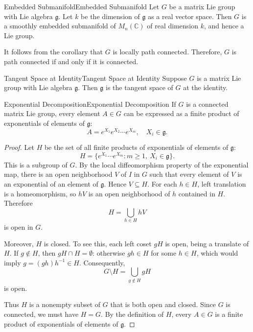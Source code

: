 \documentclass[../main.tex]{subfiles}
\begin{document}
\begin{corollary}{Embedded Submanifold}{Embedded Submanifold}
  Let $G$ be a matrix Lie group with Lie algebra $\mathfrak{g}$. Let $k$ be the dimension of $\mathfrak{g}$ as a real vector space. Then $G$ is a smoothly embedded submanifold of $M_n(\mathbb{C})$ of real dimension $k$, and hence a Lie group.
\end{corollary}
It follows from the corollary that $G$ is locally path connected. Therefore, $G$ is path connected if and only if it is connected.

\begin{corollary}{Tangent Space at Identity}{Tangent Space at Identity}
  Suppose $G$ is a matrix Lie group with Lie algebra $\mathfrak{g}$. Then $\mathfrak{g}$ is the tangent space of $G$ at the identity.
\end{corollary}

\begin{corollary}{Exponential Decomposition}{Exponential Decomposition}
  If $G$ is a connected matrix Lie group, every element $A \in G$ can be expressed as a finite product of exponentials of elements of $\mathfrak{g}$:
  \begin{equation}
    A = e^{X_1} e^{X_2} \cdots e^{X_m}, \quad X_i \in \mathfrak{g}.
  \end{equation}
\end{corollary}
\begin{proof}
  Let $H$ be the set of all finite products of exponentials of elements of $\mathfrak{g}$:
  \begin{equation*}
    H=\{e^{X_1}\cdots e^{X_m}:m\geq1,\ X_i\in\mathfrak{g}\}.
  \end{equation*}
  This is a subgroup of $G$. By the local diffeomorphism property of the exponential map, there is an open neighborhood $V$ of $I$ in $G$ such that every element of $V$ is an exponential of an element of $\mathfrak{g}$. Hence $V\subseteq H$. For each $h\in H$, left translation is a homeomorphism, so $hV$ is an open neighborhood of $h$ contained in $H$. Therefore
  \begin{equation*}
    H=\bigcup_{h\in H}hV
  \end{equation*}
  is open in $G$.

  Moreover, $H$ is closed. To see this, each left coset $gH$ is open, being a translate of $H$. If $g\notin H$, then $gH\cap H=\emptyset$: otherwise $gh\in H$ for some $h\in H$, which would imply $g=(gh)h^{-1}\in H$. Consequently,
  \begin{equation*}
    G\setminus H=\bigcup_{g\notin H}gH
  \end{equation*}
  is open.

  Thus $H$ is a nonempty subset of $G$ that is both open and closed. Since $G$ is connected, we must have $H=G$. By the definition of $H$, every $A\in G$ is a finite product of exponentials of elements of $\mathfrak{g}$.
\end{proof}
\end{document}
